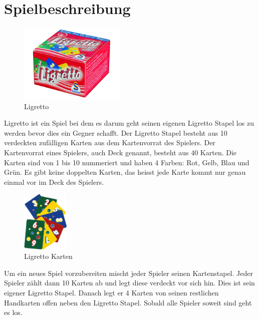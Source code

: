 ﻿\section{Spielbeschreibung}

\begin{figure}[hbt]
  \centering
  \includegraphics[width=0.45\textwidth,angle=0]{graphics/ligretto.jpg}
  \caption{Ligretto \hfill{} }
 \end{figure}

Ligretto ist ein Spiel bei dem es darum geht seinen eigenen Ligretto Stapel los zu werden bevor dies ein Gegner schafft. Der Ligretto Stapel besteht aus 10 verdeckten zufälligen Karten aus dem Kartenvorrat des Spielers. Der Kartenvorrat eines Spielers, auch Deck genannt, besteht aus 40 Karten. Die Karten sind von 1 bis 10 nummeriert und haben 4 Farben: Rot, Gelb, Blau und Grün. Es gibt keine doppelten Karten, das heisst jede Karte kommt nur genau einmal vor im Deck des Spielers.

\begin{figure}[hbt]
  \centering
  \includegraphics[width=0.20\textwidth,angle=0]{graphics/ligretto.png}
  \caption{Ligretto Karten \hfill{} }
 \end{figure}

Um ein neues Spiel vorzubereiten mischt jeder Spieler seinen Kartenstapel. Jeder Spieler zählt dann 10 Karten ab und legt diese verdeckt vor sich hin. Dies ist sein eigener Ligretto Stapel. Danach legt er 4 Karten von seinen restlichen Handkarten offen neben den Ligretto Stapel. Sobald alle Spieler soweit sind geht es los.

